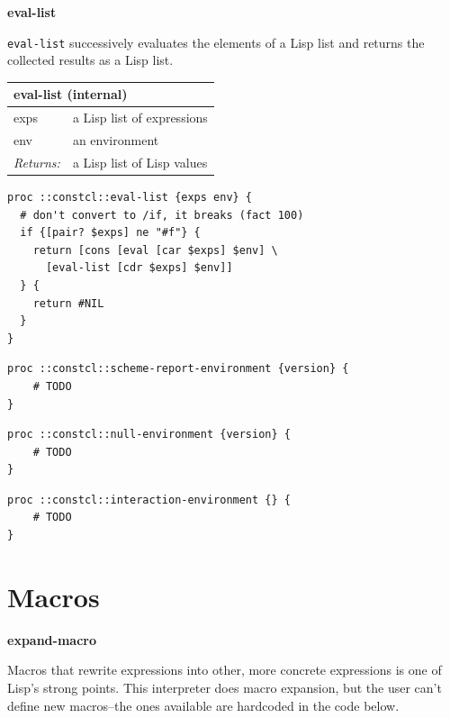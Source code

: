 \documentclass[twoside,9pt]{report}
\begin{document}
\textbf{eval-list}


\texttt{eval-list} successively evaluates the elements of a Lisp list and returns the collected results as a Lisp list.

\begin{tabular}{ |l l| }
\hline
\multicolumn{2}{|l|}{eval-list (internal)} \\
\hline
exps & a Lisp list of expressions \\
env & an environment \\
\textit{Returns:} & a Lisp list of Lisp values \\
\hline
\end{tabular}

\noindent\makebox[\linewidth]{\rule{\linewidth}{0.4pt}}
\begin{lstlisting}
proc ::constcl::eval-list {exps env} {
  # don't convert to /if, it breaks (fact 100)
  if {[pair? $exps] ne "#f"} {
    return [cons [eval [car $exps] $env] \
      [eval-list [cdr $exps] $env]]
  } {
    return #NIL
  }
}
\end{lstlisting}
\noindent\makebox[\linewidth]{\rule{\linewidth}{0.4pt}}
\noindent\makebox[\linewidth]{\rule{\linewidth}{0.4pt}}
\begin{lstlisting}
proc ::constcl::scheme-report-environment {version} {
    # TODO
}
\end{lstlisting}
\noindent\makebox[\linewidth]{\rule{\linewidth}{0.4pt}}
\noindent\makebox[\linewidth]{\rule{\linewidth}{0.4pt}}
\begin{lstlisting}
proc ::constcl::null-environment {version} {
    # TODO
}
\end{lstlisting}
\noindent\makebox[\linewidth]{\rule{\linewidth}{0.4pt}}
\noindent\makebox[\linewidth]{\rule{\linewidth}{0.4pt}}
\begin{lstlisting}
proc ::constcl::interaction-environment {} {
    # TODO
}
\end{lstlisting}
\noindent\makebox[\linewidth]{\rule{\linewidth}{0.4pt}}
\section{Macros}
\label{macros}

\textbf{expand-macro}


Macros that rewrite expressions into other, more concrete expressions is one of Lisp's strong points. This interpreter does macro expansion, but the user can't define new macros--the ones available are hardcoded in the code below.
\end{document}
